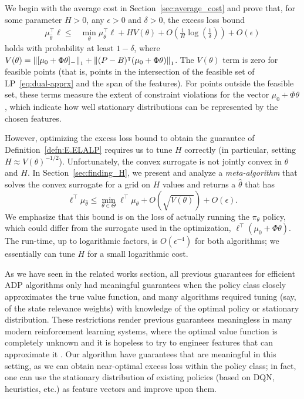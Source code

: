 \documentclass[11pt]{article}
\begin{document}
We begin with the average cost in Section~\ref{sec:average_cost} and prove that, for some parameter $H>0$, any $\epsilon >0$ and $\delta>0$, the excess loss bound
\begin{align*}
\mu_{\widehat\theta}^\top \ell \le& \min_\theta \mu_\theta^\top \ell + H V(\theta) + O\left(\frac{1}{H} \log\left(\frac1\delta\right)\right) + O(\epsilon)
\end{align*}
holds with probability at least $1-\delta$, where
$V(\theta) = \left\Vert[\mu_0 + \Phi\theta]_{-}\right\Vert_1 + \left\Vert(P - B)^\intercal
  (\mu_0 + \Phi\theta)\right\Vert_1$. The $V(\theta)$ term is zero for feasible
points (that is, points in the intersection of the feasible set of
LP~\eqref{eq:dual-apprx} and the span of the features). For points
outside the feasible set, these terms measure the extent of constraint
violations for the vector $\mu_0 + \Phi\theta$, which indicate how
well stationary distributions can be represented by the chosen
features.

However, optimizing the excess loss bound to obtain the guarantee of Definition~\ref{defn:E.ELALP} requires us to tune $H$ correctly (in particular, setting $H \approx V(\theta)^{-1/2}$). Unfortunately, the convex surrogate is not jointly convex in $\theta$ and $H$. In Section~\ref{sec:finding_H}, we present and analyze a \emph{meta-algorithm} that solves the convex surrogate for a grid on $H$ values and returns a $\widehat\theta$ that has
\begin{equation*}
  \ell^\top\mu_{\widehat\theta}
  \leq
    \min_{\theta\in\Theta} \ell^\top\mu_{\theta}+ O\left(\sqrt{V(\theta)}\right)
    +O(\epsilon).
  \end{equation*}
  We emphasize that this bound is on the loss of actually running the $\pi_\theta$ policy, which could differ from the surrogate used in the optimization, $\ell^\top(\mu_0 + \Phi\theta)$. The run-time, up to logarithmic factors, is $O(\epsilon^{-4})$ for both algorithms; we essentially can tune $H$ for a small logarithmic cost.

  As we have seen in the related works section, all previous guarantees for efficient ADP algorithms only had meaningful guarantees when the policy class closely approximates the true value function,
  and many algorithms required tuning (say, of the state relevance weights) with knowledge of the optimal policy or stationary distribution. These restrictions render previous guarantees meaningless in many modern reinforcement learning systems, where the optimal value function is completely unknown and it is hopeless to try to engineer features that can approximate it \citep{goodfellow2016deep}. Our algorithm have guarantees that are meaningful in this setting, as we can obtain near-optimal excess loss within the policy class; in fact, one can use the stationary distribution of existing policies (based on DQN, heuristics, etc.) as feature vectors and improve upon them.
\end{document}
